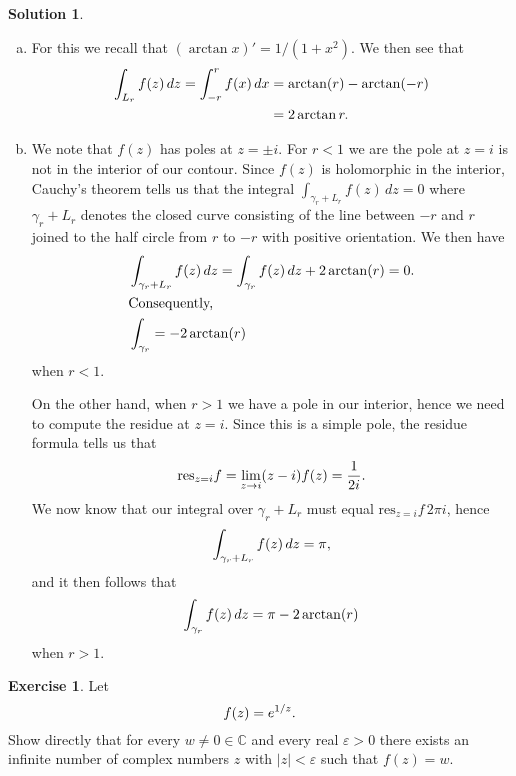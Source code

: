 \documentclass[a4paper, 10pt]{amsart}
\theoremstyle{definition}
\newtheorem{exrc}{Exercise}
\newtheorem*{sltn}{Solution}
\newcommand{\res}[2]{\mathrm{res}_{#1}#2}
\begin{document}
\begin{sltn}\hfill\\
  \begin{enumerate}[a)]
    \item For this we recall that $(\arctan x)' = 1 / (1 + x^2)$.
      We then see that
      \begin{align*}
        \notag
        \int_{L_r} f(z) \, dz = \int_{-r}^{r} f(x) \, dx &= \arctan (r) - \arctan (-r)\\
                              &= 2\arctan r.
      \end{align*}
    \item We note that $f(z)$ has poles at $z = \pm i$. For $r < 1$ we are the
      pole at $z = i$ is not in the interior of our contour. Since $f(z)$ is
      holomorphic in the interior, Cauchy's theorem tells us that the integral
      $\int_{\gamma_r + L_r} f(z) \, dz = 0$ where $\gamma_r + L_r$ denotes the
      closed curve consisting of the line between $-r$ and $r$ joined to the
      half circle from $r$ to $-r$ with positive orientation. We then have
      \begin{align*}
        &\int_{\gamma_r + L_r} f(z) \, dz = \int_{\gamma_r} f(z) \, dz + 2 \arctan(r) = 0.\\
        \intertext{Consequently, }
        &\int_{\gamma_r} = -2\arctan(r)
      \end{align*}
      when $r < 1$.

      On the other hand, when $r > 1$ we have a pole in our interior, hence we
      need to compute the residue at $z = i$. Since this is a simple pole, the residue formula tells us that
      \begin{equation}
        \notag
        \res{z=i}{f} = \lim_{z \to i} (z - i) f(z) = \frac{1}{2i}.
      \end{equation}
      We now know that our integral over $\gamma_r + L_r$ must equal $\res{z=i}f \, 2\pi i$, hence
      \begin{equation}
        \notag
        \int_{\gamma_r + L_r} f(z) \, dz = \pi,
      \end{equation}
      and it then follows that
      \begin{equation}
        \notag
        \int_{\gamma_r} f(z) \, dz = \pi - 2\arctan(r)
      \end{equation}
      when $r > 1$.
  \end{enumerate}
\end{sltn}
\begin{exrc}
  Let
  \begin{equation}
    \notag
    f(z) = e^{1/z}.
  \end{equation}
  Show directly that for every $w \neq 0 \in \mathbb{C}$ and every real
  $\varepsilon > 0$ there exists an infinite number of complex numbers $z$ with
  $|z| < \varepsilon$ such that $f(z) = w$.
\end{exrc}
\end{document}
